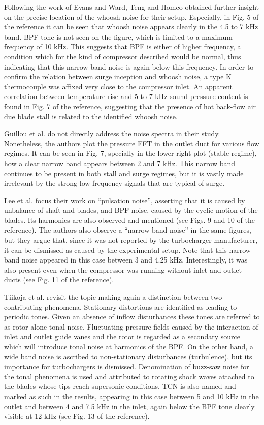 Following the work of Evans and Ward, Teng and Homco \cite{teng2009investigation} obtained further insight on the precise location of the whoosh noise for their setup. Especially, in Fig. 5 of the reference it can be seen that whoosh noise appears clearly in the 4.5 to 7 kHz band. BPF tone is not seen on the figure, which is limited to a maximum frequency of 10 kHz. This suggests that BPF is either of higher frequency, a condition which for the kind of compressor described would be normal, thus indicating that this narrow band noise is again below this frequency. In order to confirm the relation between surge inception and whoosh noise, a type K thermocouple was affixed very close to the compressor inlet. An apparent correlation between temperature rise and 5 to 7 kHz sound pressure content is found in Fig. 7 of the reference, suggesting that the presence of hot back-flow air due blade stall is related to the identified whoosh noise.

Guillou et al. \cite{guillou2010characterization} do not directly address the noise spectra in their study. Nonetheless, the authors plot the pressure FFT in the outlet duct for various flow regimes. It can be seen in Fig. 7, specially in the lower right plot (stable regime), how a clear narrow band appears between 2 and 7 kHz. This narrow band continues to be present in both stall and surge regimes, but it is vastly made irrelevant by the strong low frequency signals that are typical of surge.

Lee et al. \cite{lee2011control} focus their work on ``pulsation noise'', asserting that it is caused by unbalance of shaft and blades, and BPF noise, caused by the cyclic motion of the blades. Its harmonics are also observed and mentioned (see Figs. 9 and 10 of the reference). The authors also observe a ``narrow band noise'' in the same figures, but they argue that, since it was not reported by the turbocharger manufacturer, it can be dismissed as caused by the experimental setup. Note that this narrow band noise appeared in this case between 3 and 4.25 kHz. Interestingly, it was also present even when the compressor was running without inlet and outlet ducts (see Fig. 11 of the reference).

Tiikoja et al. \cite{tiikoja2011inves} revisit the topic making again a distinction between two contributing phenomena. Stationary distortions are identified as leading to periodic tones. Given an absence of inflow disturbances these tones are referred to as rotor-alone tonal noise. Fluctuating pressure fields caused by the interaction of inlet and outlet guide vanes and the rotor is regarded as a secondary source which will introduce tonal noise at harmonics of the BPF. On the other hand, a wide band noise is ascribed to non-stationary disturbances (turbulence), but its importance for turbochargers is dismissed. Denomination of buzz-saw noise for the tonal phenomena is used and attributed to rotating shock waves attached to the blades whose tips reach supersonic conditions. TCN is also named and marked as such in the results, appearing in this case between 5 and 10 kHz in the outlet and between 4 and 7.5 kHz in the inlet, again below the BPF tone clearly visible at 12 kHz (see Fig. 13 of the reference).

